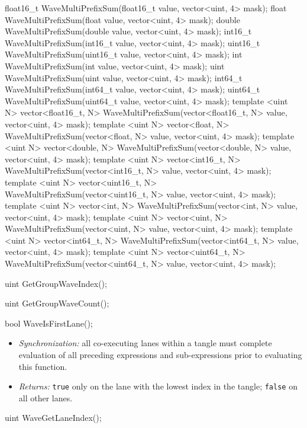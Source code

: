 \begin{HLSL}
float16_t WaveMultiPrefixSum(float16_t value, vector<uint, 4> mask);
float WaveMultiPrefixSum(float value, vector<uint, 4> mask);
double WaveMultiPrefixSum(double value, vector<uint, 4> mask);
int16_t WaveMultiPrefixSum(int16_t value, vector<uint, 4> mask);
uint16_t WaveMultiPrefixSum(uint16_t value, vector<uint, 4> mask);
int WaveMultiPrefixSum(int value, vector<uint, 4> mask);
uint WaveMultiPrefixSum(uint value, vector<uint, 4> mask);
int64_t WaveMultiPrefixSum(int64_t value, vector<uint, 4> mask);
uint64_t WaveMultiPrefixSum(uint64_t value, vector<uint, 4> mask);
template <uint N>
vector<float16_t, N> WaveMultiPrefixSum(vector<float16_t, N> value, vector<uint, 4> mask);
template <uint N>
vector<float, N> WaveMultiPrefixSum(vector<float, N> value, vector<uint, 4> mask);
template <uint N>
vector<double, N> WaveMultiPrefixSum(vector<double, N> value, vector<uint, 4> mask);
template <uint N>
vector<int16_t, N> WaveMultiPrefixSum(vector<int16_t, N> value, vector<uint, 4> mask);
template <uint N>
vector<uint16_t, N> WaveMultiPrefixSum(vector<uint16_t, N> value, vector<uint, 4> mask);
template <uint N>
vector<int, N> WaveMultiPrefixSum(vector<int, N> value, vector<uint, 4> mask);
template <uint N>
vector<uint, N> WaveMultiPrefixSum(vector<uint, N> value, vector<uint, 4> mask);
template <uint N>
vector<int64_t, N> WaveMultiPrefixSum(vector<int64_t, N> value, vector<uint, 4> mask);
template <uint N>
vector<uint64_t, N> WaveMultiPrefixSum(vector<uint64_t, N> value, vector<uint, 4> mask);

uint GetGroupWaveIndex();

uint GetGroupWaveCount();
\end{HLSL}


\begin{HLSL}
bool WaveIsFirstLane();
\end{HLSL}

\begin{itemize}
  \item \textit{Synchronization:} all co-executing \gls{lane}s within a \gls{tangle}
  must complete evaluation of all preceding expressions and sub-expressions
  prior to evaluating this function.
  \item \textit{Returns:} \texttt{true} only on the \gls{lane} with the
  lowest index in the \gls{tangle}; \texttt{false} on all other lanes.
\end{itemize}

\begin{HLSL}
uint WaveGetLaneIndex();
\end{HLSL}

